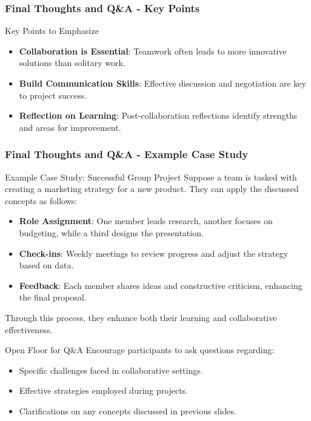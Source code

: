 \documentclass[aspectratio=169]{beamer}
\begin{document}
\begin{frame}[fragile]
    \frametitle{Final Thoughts and Q\&A - Key Points}
    \begin{block}{Key Points to Emphasize}
        \begin{itemize}
            \item \textbf{Collaboration is Essential}: Teamwork often leads to more innovative solutions than solitary work.
            \item \textbf{Build Communication Skills}: Effective discussion and negotiation are key to project success.
            \item \textbf{Reflection on Learning}: Post-collaboration reflections identify strengths and areas for improvement.
        \end{itemize}
    \end{block}
\end{frame}

\begin{frame}[fragile]
    \frametitle{Final Thoughts and Q\&A - Example Case Study}
    \begin{block}{Example Case Study: Successful Group Project}
        Suppose a team is tasked with creating a marketing strategy for a new product. They can apply the discussed concepts as follows:
        \begin{itemize}
            \item \textbf{Role Assignment}: One member leads research, another focuses on budgeting, while a third designs the presentation.
            \item \textbf{Check-ins}: Weekly meetings to review progress and adjust the strategy based on data.
            \item \textbf{Feedback}: Each member shares ideas and constructive criticism, enhancing the final proposal.
        \end{itemize}
        Through this process, they enhance both their learning and collaborative effectiveness.
    \end{block}
    
    \begin{block}{Open Floor for Q\&A}
        Encourage participants to ask questions regarding:
        \begin{itemize}
            \item Specific challenges faced in collaborative settings.
            \item Effective strategies employed during projects.
            \item Clarifications on any concepts discussed in previous slides.
        \end{itemize}
    \end{block}
\end{frame}
\end{document}

